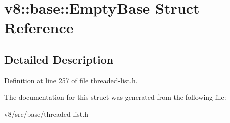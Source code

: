 \hypertarget{structv8_1_1base_1_1EmptyBase}{}\section{v8\+:\+:base\+:\+:Empty\+Base Struct Reference}
\label{structv8_1_1base_1_1EmptyBase}


\subsection{Detailed Description}


Definition at line 257 of file threaded-\/list.\+h.



The documentation for this struct was generated from the following file\+:\begin{DoxyCompactItemize}
\item 
v8/src/base/threaded-\/list.\+h\end{DoxyCompactItemize}

